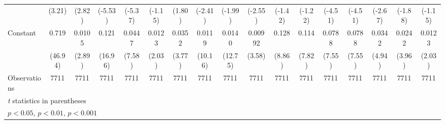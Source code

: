 \begin{table}[htbp]
\begin{tabular}{l*{16}{c}}
                    &      (3.21)         &      (2.82)         &     (-5.53)         &     (-5.37)         &     (-1.15)         &      (1.80)         &     (-2.41)         &     (-1.99)         &     (-2.55)         &     (-1.42)         &     (-1.22)         &     (-4.51)         &     (-4.51)         &     (-2.67)         &     (-1.88)         &     (-1.15)         \\
\addlinespace
Constant            &       0.719\sym{***}&      0.0105\sym{**} &       0.121\sym{***}&      0.0447\sym{***}&      0.0123\sym{*}  &      0.0352\sym{***}&      0.0119\sym{***}&      0.0140\sym{***}&     0.00992\sym{***}&       0.128\sym{***}&       0.114\sym{***}&      0.0788\sym{***}&      0.0788\sym{***}&      0.0342\sym{***}&      0.0242\sym{***}&      0.0123\sym{*}  \\
                    &     (46.94)         &      (2.89)         &     (16.96)         &      (7.58)         &      (2.03)         &      (3.77)         &     (10.16)         &     (12.75)         &      (3.58)         &      (8.86)         &      (7.82)         &      (7.55)         &      (7.55)         &      (4.94)         &      (3.96)         &      (2.03)         \\
\midrule
Observations        &        7711         &        7711         &        7711         &        7711         &        7711         &        7711         &        7711         &        7711         &        7711         &        7711         &        7711         &        7711         &        7711         &        7711         &        7711         &        7711         \\
\bottomrule
\multicolumn{17}{l}{\footnotesize \textit{t} statistics in parentheses}\\
\multicolumn{17}{l}{\footnotesize \sym{*} \(p<0.05\), \sym{**} \(p<0.01\), \sym{***} \(p<0.001\)}\\
\end{tabular}
\end{table}
